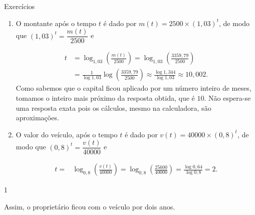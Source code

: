 \clearpage
\def\currentcolor{cor1}
\marginpar{\vspace{.5em}}
\begin{answer}{Exercícios}
{
	\exerciselist
	\begin{enumerate}
	\Item 
	\begin{equation*}
	x-y= \log_4 7 -\frac{\log_4 7^2}{\log_4 16} = \log_4 7 -2\frac{\log_4 7}{2} =0.
	\end{equation*}

	\Item
	\begin{equation*}
	 \log_9 128 = \frac{\log 2^7}{\log 3^2}= \frac{7\log 2}{2\log 3}\approx \frac{7\times 0{,}301}{2\times 0{,}477} \approx 2{,}208
	\end{equation*}

	\item O montante após o tempo $t$ é dado por $m(t) = 2500\times (1{,}03)^t$, de modo que $(1{,}03)^t = \dfrac{m(t)}{2500}$ e

	\begin{align*}
	t &= \log_{1{,}03} \left(\frac{m(t)}{2500}\right)=\log_{1{,}03} \left(\frac{3359,79}{2500}\right)\\
	&=\frac{1}{\log {1{,}03}} \log \left(\frac{3359,79}{2500}\right)\approx \frac{\log 1{,}344}{\log {1{,}03}} \approx 10{,}002.
	\end{align*}
	Como sabemos que o capital ficou aplicado por um número inteiro de meses, tomamos o inteiro mais próximo da resposta obtida, que é $10$. Não espera-se uma resposta exata pois os cálculos, mesmo na calculadora, são aproximações.

	\item O valor do veículo, após o tempo $t$ é dado por $v(t) = 40000\times (0{,}8)^t$, de modo que $(0{,}8)^t = \dfrac{v(t)}{40000}$ e

	\begin{align*}
	t =& \log_{0{,}8} \left(\frac{v(t)}{40000}\right)=\log_{0{,}8} \left(\frac{25600}{40000}\right)=\frac{\log {0{,}64}}{\log {0{,}8}}=2.
	\end{align*}
	\end{enumerate}
}{1}
\end{answer}
\exercise


Assim, o proprietário ficou com o veículo por dois anos.

